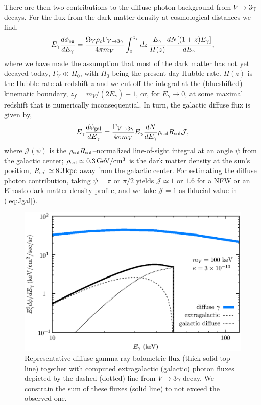 \documentclass[prd,reprint,nofootinbib,notitlepage,aps,tightenlines,preprintnumbers,amsmath,amssymb,showpacs,superscriptaddress]{revtex4-1}
\newcommand{\cm}{\ensuremath{\mathrm{cm}}}
\newcommand{\GeV}{\ensuremath{\mathrm{GeV}}}
\begin{document}
There are then two contributions to the diffuse photon background from
$V\to 3\gamma$ decays. For the flux from the dark matter density at
cosmological distances we find,
%
\begin{align}
  E_\gamma \frac{d\phi_{\rm eg}}{dE_{\gamma}} =   \frac{\Omega_V \rho_c \Gamma_{V\to3\gamma}}{4\pi m_V} 
  \int_0^{z_f} dz\, \frac{ E_{\gamma}}{H(z) } \frac{ dN[(1+z)E_{\gamma}]}{ dE_{\gamma}} ,
\end{align}
%
where we have made the assumption that most of the dark matter has not yet
decayed today, $\Gamma_V\ll H_0$, with $H_0$ being the present day
Hubble rate. $H(z)$ is the Hubble rate at redshift $z$ and we cut off
the integral at the (blueshifted) kinematic boundary,
$ z_f = m_V/(2E_{\gamma}) - 1$, or, for $E_{\gamma}\to 0 $, at some
maximal redshift that is numerically inconsequential.
%
In turn, the galactic diffuse flux is given by,
\begin{align}
\label{eq:Jgal}
  E_\gamma \frac{d\phi_{\rm gal}}{dE_{\gamma}} =   \frac{ \Gamma_{V\to 3 \gamma}   }{4\pi m_V} 
  E_{\gamma} \frac{dN}{dE_{\gamma}}  \rho_{\rm sol}  R_{\rm sol} \mathcal{J}, 
\end{align}
%
where $\mathcal{J(\psi)}$ is the
$\rho_{\rm sol} R_{\rm sol}$--normalized line-of-sight integral at an
angle $\psi$ from the galactic center;
$\rho_{\rm sol} \simeq 0.3\,\GeV/\cm^3 $ is the dark matter density at
the sun's position, $R_{\rm sol} \simeq 8.3\,\rm kpc $ away from the
galactic center. For estimating the diffuse photon contribution,
taking $\psi = \pi$ or $\pi/2$ yields
$\mathcal{J} \simeq 1$ or $1.6$ for a NFW or an Einasto dark matter
density profile, and we take $\mathcal{J}=1$ as fiducial value in
(\ref{eq:Jgal}).%
%

\begin{figure}
\centering
\includegraphics[width=\columnwidth]{DM_diffuse.eps}%
\caption{\footnotesize Representative diffuse gamma ray bolometric
  flux (thick solid top line) together with computed extragalactic
  (galactic) photon fluxes depicted by the dashed (dotted) line from
  $V\to 3\gamma$ decay. We constrain the sum of these fluxes (solid
  line) to not exceed the observed one.}
\label{fig:diffuse}
\end{figure}
\end{document}
